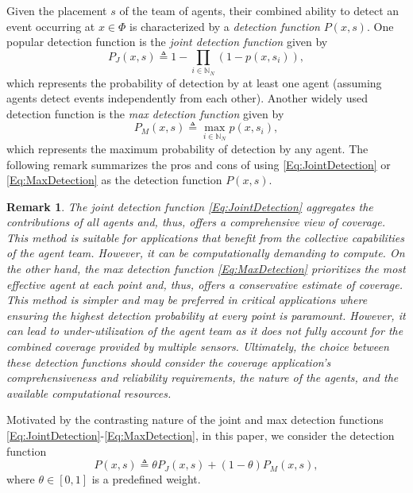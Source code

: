 \documentclass[letterpaper, 10 pt, conference]{ieeeconf}
\newcommand{\N}{\mathbb{N}}
\newtheorem{remark}{Remark}
\begin{document}
Given the placement $s$ of the team of agents, their combined ability to detect an event occurring at $x \in \Phi$ is characterized by a \emph{detection function} $P(x,s)$. One popular detection function is the \emph{joint detection function} given by 
\begin{equation}\label{Eq:JointDetection}
P_J(x,s) \triangleq 1-\prod_{i\in\N_N}(1-p(x,s_i)),
\end{equation}
which represents the probability of detection by at least one agent (assuming agents detect events independently from each other). Another widely used detection function is the \emph{max detection function} given by 
\begin{equation}\label{Eq:MaxDetection}
P_M(x,s) \triangleq \max_{i\in\N_N} p(x,s_i),
\end{equation}
which represents the maximum probability of detection by any agent. The following remark summarizes the pros and cons of using \eqref{Eq:JointDetection} or \eqref{Eq:MaxDetection} as the detection function $P(x,s)$.  

\begin{remark}
The joint detection function \eqref{Eq:JointDetection} aggregates the contributions of all agents and, thus, offers a comprehensive view of coverage. This method is suitable for applications that benefit from the collective capabilities of the agent team. However, it can be computationally demanding to compute. 
On the other hand, the max detection function \eqref{Eq:MaxDetection} prioritizes the most effective agent at each point and, thus, offers a conservative estimate of coverage. This method is simpler and may be preferred in critical applications where ensuring the highest detection probability at every point is paramount. However, it can lead to under-utilization of the agent team as it does not fully account for the combined coverage provided by multiple sensors.
Ultimately, the choice between these detection functions should consider the coverage application's comprehensiveness and reliability requirements, the nature of the agents, and the available computational resources.
\end{remark}

Motivated by the contrasting nature of the joint and max detection functions \eqref{Eq:JointDetection}-\eqref{Eq:MaxDetection}, in this paper, we consider the detection function
\begin{equation}\label{Eq:DetectionFunction}
    P(x,s) \triangleq \theta P_J(x,s) + (1-\theta) P_M(x,s),
\end{equation}
where $\theta\in[0,1]$ is a predefined weight. 
\end{document}
